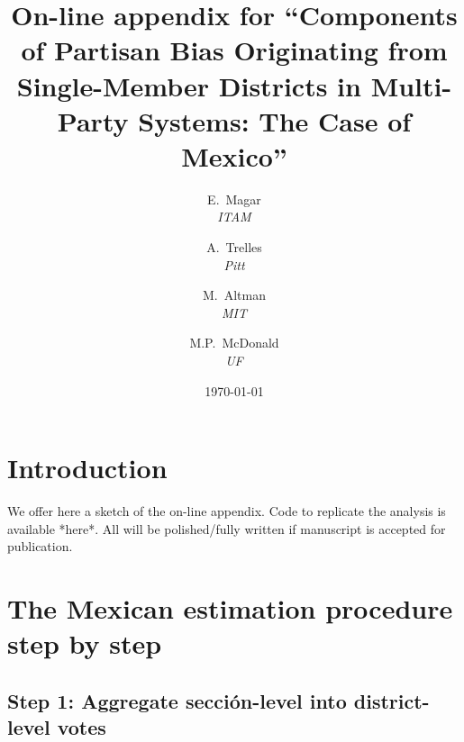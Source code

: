 \documentclass[letter,12pt]{article}
\begin{document}
\title{On-line appendix for ``Components of Partisan Bias Originating from Single-Member Districts in Multi-Party Systems: The Case of Mexico''}
\author{E.~Magar \\ \emph{ITAM} \and
        A.~Trelles \\ \emph{Pitt} \and  
        M.~Altman \\ \emph{MIT}  \and
        M.P.~McDonald \\ \emph{UF} 
      }
\date{\today}
\maketitle


\renewcommand{\thefigure}{A\arabic{figure}}
\setcounter{figure}{0}
\renewcommand{\thetable}{A\arabic{table}}
\setcounter{table}{0}
\renewcommand{\thesection}{A\arabic{section}}
\setcounter{section}{0}

\section{Introduction}

We offer here a sketch of the on-line appendix. Code to replicate the analysis is available *here*. All will be polished/fully written if manuscript is accepted for publication. 

\section{The Mexican estimation procedure step by step}

\subsection*{Step 1: Aggregate secci\'on-level into district-level votes}
\end{document}
